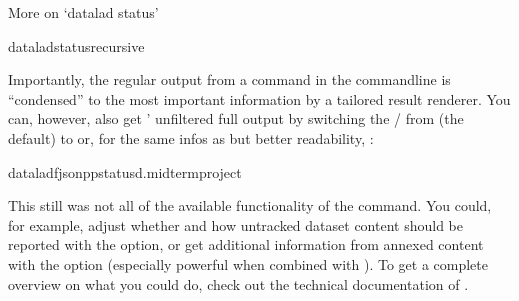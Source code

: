 \begin{findoutmore}[label={fom-status}, before title={\thetcbcounter\ }, float, check odd page=true]{More on ‘datalad status’}
\begin{sphinxVerbatim}[commandchars=\\\{\}]
dataladstatus\PYGZhy{}\PYGZhy{}recursive
\end{sphinxVerbatim}

\sphinxAtStartPar
Importantly, the regular output from a  command in the commandline is “condensed” to the most important information by a tailored result renderer.
You can, however, also get ’ unfiltered full output by switching the / from  (the default) to  or, for the same infos as  but better readability, :

\begin{sphinxVerbatim}[commandchars=\\\{\}]
datalad\PYGZhy{}fjson\PYGZus{}ppstatus\PYGZhy{}d.midterm\PYGZus{}project
\end{sphinxVerbatim}

\sphinxAtStartPar
This still was not all of the available functionality of the
 command. You could, for example, adjust whether and
how untracked dataset content should be reported with the 
option, or get additional information from annexed content with the 
option (especially powerful when combined with ). To get a complete overview on what you could do, check out the technical
documentation of  .


\end{findoutmore}
